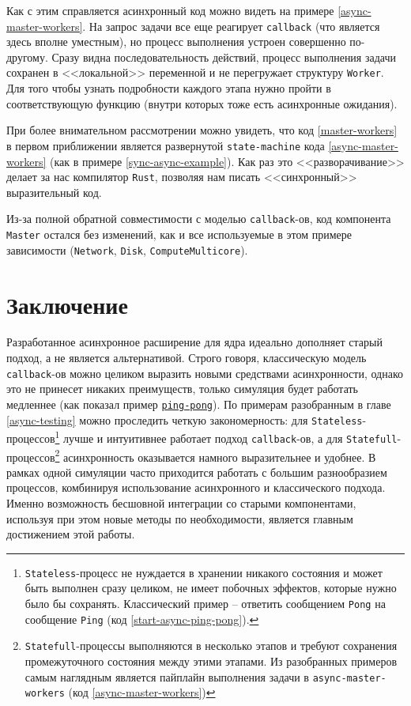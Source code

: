 Как с этим справляется асинхронный код можно видеть на примере \ref{async-master-workers}. На запрос задачи все еще реагирует \texttt{callback} (что является здесь вполне уместным), но процесс выполнения устроен совершенно по-другому. Сразу видна последовательность действий, процесс выполнения задачи сохранен в <<локальной>> переменной и не перегружает структуру \texttt{Worker}. Для того чтобы узнать подробности каждого этапа нужно пройти в соответствующую функцию (внутри которых тоже есть асинхронные ожидания). 

При более внимательном рассмотрении можно увидеть, что код \ref{master-workers} в первом приближении является развернутой \texttt{state-machine} кода \ref{async-master-workers} (как в примере \ref{sync-async-example}). Как раз это <<разворачивание>> делает за нас компилятор \texttt{Rust}, позволяя нам писать <<синхронный>> выразительный код.

Из-за полной обратной совместимости с моделью \texttt{callback}-ов, код компонента \texttt{Master} остался без изменений, как и все используемые в этом примере зависимости (\texttt{Network}, \texttt{Disk}, \texttt{ComputeMulticore}).


\section{Заключение}

Разработанное асинхронное расширение для ядра идеально дополняет старый подход, а не является альтернативой. Строго говоря, классическую модель \texttt{callback}-ов можно целиком выразить новыми средствами асинхронности, однако это не принесет никаких преимуществ, только симуляция будет работать медленнее (как показал пример \hyperref[cmp:ping-pong]{\texttt{ping-pong}}). По примерам разобранным в главе \ref{async-testing} можно проследить четкую закономерность: для \texttt{Stateless}-процессов\footnote{
    \texttt{Stateless}-процесс не нуждается в хранении никакого состояния и может быть выполнен сразу целиком, не имеет побочных эффектов, которые нужно было бы сохранять. Классический пример -- ответить сообщением \texttt{Pong} на сообщение \texttt{Ping} (код \ref{start-async-ping-pong}). }
лучше и интуитивнее работает подход \texttt{callback}-ов, а для \texttt{Statefull}-процессов\footnote{
    \texttt{Statefull}-процессы выполняются в несколько этапов и требуют сохранения промежуточного состояния между этими этапами. Из разобранных примеров самым наглядным является пайплайн выполнения задачи в \texttt{async-master-workers} (код \ref{async-master-workers})} 
асинхронность оказывается намного выразительнее и удобнее. В рамках одной симуляции часто приходится работать с большим разнообразием процессов, комбинируя использование асинхронного и классического подхода. Именно возможность бесшовной интеграции со старыми компонентами, используя при этом новые методы по необходимости, является главным достижением этой работы.



